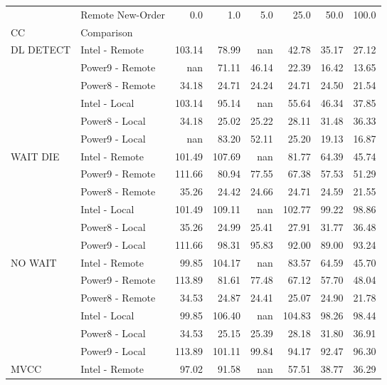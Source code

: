 \begin{tabular}{llrrrrrr}
\toprule
       & Remote New-Order &  0.0   &  1.0   &  5.0   &  25.0  &  50.0  &  100.0 \\
CC & Comparison &        &        &        &        &        &        \\
\midrule
DL DETECT & Intel - Remote & 103.14 &  78.99 &    nan &  42.78 &  35.17 &  27.12 \\
       & Power9 - Remote &    nan &  71.11 &  46.14 &  22.39 &  16.42 &  13.65 \\
       & Power8 - Remote &  34.18 &  24.71 &  24.24 &  24.71 &  24.50 &  21.54 \\
       & Intel - Local & 103.14 &  95.14 &    nan &  55.64 &  46.34 &  37.85 \\
       & Power8 - Local &  34.18 &  25.02 &  25.22 &  28.11 &  31.48 &  36.33 \\
       & Power9 - Local &    nan &  83.20 &  52.11 &  25.20 &  19.13 &  16.87 \\
WAIT DIE & Intel - Remote & 101.49 & 107.69 &    nan &  81.77 &  64.39 &  45.74 \\
       & Power9 - Remote & 111.66 &  80.94 &  77.55 &  67.38 &  57.53 &  51.29 \\
       & Power8 - Remote &  35.26 &  24.42 &  24.66 &  24.71 &  24.59 &  21.55 \\
       & Intel - Local & 101.49 & 109.11 &    nan & 102.77 &  99.22 &  98.86 \\
       & Power8 - Local &  35.26 &  24.99 &  25.41 &  27.91 &  31.77 &  36.48 \\
       & Power9 - Local & 111.66 &  98.31 &  95.83 &  92.00 &  89.00 &  93.24 \\
NO WAIT & Intel - Remote &  99.85 & 104.17 &    nan &  83.57 &  64.59 &  45.70 \\
       & Power9 - Remote & 113.89 &  81.61 &  77.48 &  67.12 &  57.70 &  48.04 \\
       & Power8 - Remote &  34.53 &  24.87 &  24.41 &  25.07 &  24.90 &  21.78 \\
       & Intel - Local &  99.85 & 106.40 &    nan & 104.83 &  98.26 &  98.44 \\
       & Power8 - Local &  34.53 &  25.15 &  25.39 &  28.18 &  31.80 &  36.91 \\
       & Power9 - Local & 113.89 & 101.11 &  99.84 &  94.17 &  92.47 &  96.30 \\
MVCC & Intel - Remote &  97.02 &  91.58 &    nan &  57.51 &  38.77 &  36.29 \\

\end{tabular}
